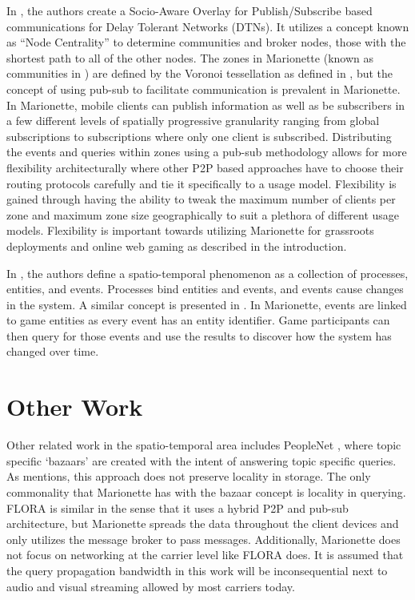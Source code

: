 \documentclass[12pt]{report}	%
\theoremstyle{definition}
\theoremstyle{remark}
\begin{document}
In \cite{yoneki2007socio}, the authors create a
Socio-Aware Overlay for Publish/Subscribe based communications for Delay
Tolerant Networks (DTNs). It utilizes a concept known as ``Node
Centrality'' to determine communities and broker nodes, those with the
shortest path to all of the other nodes. The zones in Marionette (known
as communities in \cite{yoneki2007socio}) are defined
by the Voronoi tessellation as defined in
\cite{zio2011p2p}, but the concept of using pub-sub to
facilitate communication is prevalent in Marionette. In Marionette, mobile
clients can publish information as well as be subscribers in a few
different levels of spatially progressive granularity ranging from global 
subscriptions to subscriptions where only one client is subscribed. Distributing the
events and queries within zones using a pub-sub methodology allows for
more flexibility architecturally where other
P2P based approaches have to choose their routing protocols carefully
and tie it specifically to a usage model. Flexibility is gained through 
having the ability to tweak the maximum number of clients per zone and maximum
zone size geographically to suit a plethora of different usage models. 
Flexibility is important towards
utilizing Marionette for grassroots deployments and online web gaming as 
described in the introduction.

In \cite{wang2005event}, the authors define a
spatio-temporal phenomenon as a collection of processes, entities, and
events. Processes bind entities and events, and events cause changes in the
system. A similar concept is presented in
\cite{chen1998event}. In Marionette, events are linked to game entities as every event
has an entity identifier. Game participants can then query for those events
and use the results to discover how the system has changed over time.

\section{Other Work}

Other related work in the spatio-temporal area includes PeopleNet
\cite{motani2005peoplenet}, where topic specific
`bazaars' are created with the intent of answering topic specific
queries. As \cite{zio2011p2p} mentions, this approach
does not preserve locality in storage. The only commonality that
Marionette has with the bazaar concept is locality in querying. FLORA
\cite{kokku2008enabling} is similar in the sense that
it uses a hybrid P2P and pub-sub architecture, but Marionette spreads the
data throughout the client devices and only utilizes the message broker to
pass messages. Additionally, Marionette does not focus on
networking at the carrier level like FLORA does. It is assumed that the
query propagation bandwidth in this work will be inconsequential next to
audio and visual streaming allowed by most carriers today.
\end{document}

